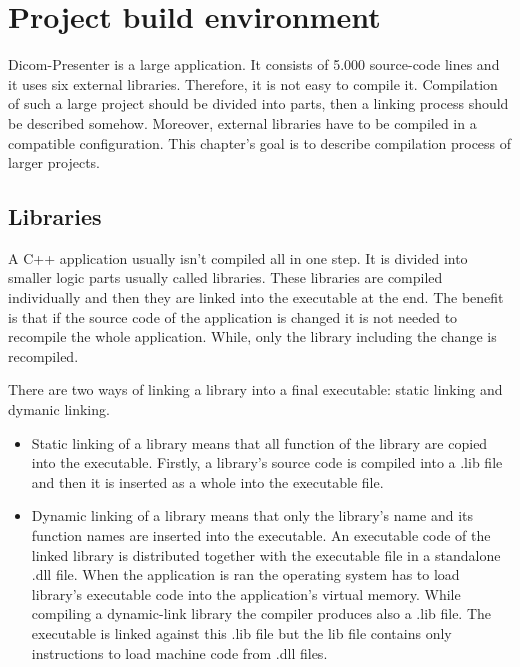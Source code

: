 \chapter{Project build environment}
\vspace{-10mm}

Dicom-Presenter is a large application. It consists of 5.000 source-code lines and it uses six external libraries. Therefore, it is not easy to compile it. Compilation of such a large project should be divided into parts, then a linking process should be described somehow. Moreover, external libraries have to be compiled in a compatible configuration. This chapter's goal is to describe compilation process of larger projects.

\section{Libraries}

\label{library}

A C++ application usually isn't compiled all in one step. It is divided into smaller logic parts usually called libraries. These libraries are compiled individually and then they are linked into the executable at the end. The benefit is that if the source code of the application is changed it is not needed to recompile the whole application. While, only the library including the change is recompiled. 

There are two ways of linking a library into a final executable: static linking and dymanic linking.
\begin{itemize}
\item Static linking of a library means that all function of the library are copied into the executable. Firstly, a library's source code is compiled into a .lib file and then it is inserted as a whole into the executable file.
\item Dynamic linking of a library means that only the library's name and its function names are inserted into the executable. An executable code of the linked library is distributed together with the executable file in a standalone .dll file. When the application is ran the operating system has to load library's executable code into the application's virtual memory. While compiling a dynamic-link library the compiler produces also a .lib file. The executable is linked against this .lib file but the lib file contains only instructions to load machine code from .dll files.
\end{itemize}


